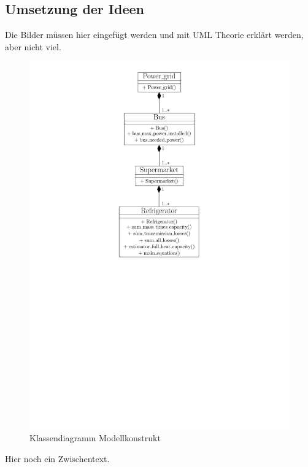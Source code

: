 \subsection{Umsetzung der Ideen}
Die Bilder müssen hier eingefügt werden und mit UML Theorie erklärt werden, aber nicht viel.
\begin{figure}
\caption{Klassendiagramm Modellkonstrukt}
	\label{klassendiagramm}
	\begin{center}
	\includegraphics[scale=0.8]{images/Theorie_Super/class_diagramm}
	\end{center}
\end{figure}

Hier noch ein Zwischentext.

